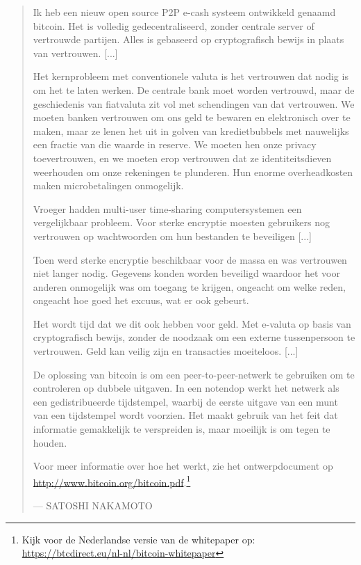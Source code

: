 \documentclass[smalldemyvopaper,11pt,twoside,onecolumn,openright,extrafontsizes]{memoir}
\begin{document}
\begin{quotation}
Ik heb een nieuw open source P2P e-cash systeem ontwikkeld genaamd bitcoin. Het is volledig gedecentraliseerd, zonder centrale server of vertrouwde partijen. Alles is gebaseerd op cryptografisch bewijs in plaats van vertrouwen. [...]

Het kernprobleem met conventionele valuta is het vertrouwen dat nodig is om het te laten werken. De centrale bank moet worden vertrouwd, maar de geschiedenis van fiatvaluta zit vol met schendingen van dat vertrouwen. We moeten banken vertrouwen om ons geld te bewaren en elektronisch over te maken, maar ze lenen het uit in golven van kredietbubbels met nauwelijks een fractie van die waarde in reserve. We moeten hen onze privacy toevertrouwen, en we moeten erop vertrouwen dat ze identiteitsdieven weerhouden om onze rekeningen te plunderen. Hun enorme overheadkosten maken microbetalingen onmogelijk.

Vroeger hadden \textquotedbl{}multi-user time-sharing computersystemen\textquotedbl{} een vergelijkbaar probleem. Voor sterke encryptie moesten gebruikers nog vertrouwen op wachtwoorden om hun bestanden te beveiligen [...]

Toen werd sterke encryptie beschikbaar voor de massa en was vertrouwen niet langer nodig. Gegevens konden worden beveiligd waardoor het voor anderen onmogelijk was om toegang te krijgen, ongeacht om welke reden, ongeacht hoe goed het excuus, wat er ook gebeurt.

Het wordt tijd dat we dit ook hebben voor geld. Met e-valuta op basis van cryptografisch bewijs, zonder de noodzaak om een externe tussenpersoon te vertrouwen. Geld kan veilig zijn en transacties moeiteloos. [...]

De oplossing van bitcoin is om een peer-to-peer-netwerk te gebruiken om te controleren op dubbele uitgaven. In een notendop werkt het netwerk als een gedistribueerde tijdstempel, waarbij de eerste uitgave van een munt van een tijdstempel wordt voorzien. Het maakt gebruik van het feit dat informatie gemakkelijk te verspreiden is, maar moeilijk is om tegen te houden.

Voor meer informatie over hoe het werkt, zie het ontwerpdocument op \href{http://www.bitcoin.org/bitcoin.pdf}{http://www.bitcoin.org/bitcoin.pdf}.\footnote{Kijk voor de Nederlandse versie van de whitepaper op: \href{https://btcdirect.eu/nl-nl/bitcoin-whitepaper}{https://btcdirect.eu/nl-nl/bitcoin-whitepaper}}
\par\raggedleft--- \textup{SATOSHI NAKAMOTO}
\end{quotation}
\end{document}
